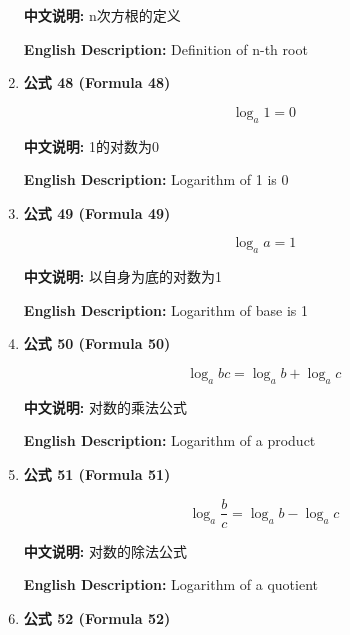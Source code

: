 \documentclass[12pt,a4paper]{article}
\begin{document}
\begin{enumerate}[leftmargin=*]
\textbf{中文说明:} n次方根的定义

\textbf{English Description:} Definition of n-th root

\vspace{0.5cm}

\item \textbf{公式 48 (Formula 48)}

\begin{equation}
\log_a{1} = 0
\end{equation}

\textbf{中文说明:} 1的对数为0

\textbf{English Description:} Logarithm of 1 is 0

\vspace{0.5cm}

\item \textbf{公式 49 (Formula 49)}

\begin{equation}
\log_a{a} = 1
\end{equation}

\textbf{中文说明:} 以自身为底的对数为1

\textbf{English Description:} Logarithm of base is 1

\vspace{0.5cm}

\item \textbf{公式 50 (Formula 50)}

\begin{equation}
\log_a{bc} = \log_a{b} + \log_a{c}
\end{equation}

\textbf{中文说明:} 对数的乘法公式

\textbf{English Description:} Logarithm of a product

\vspace{0.5cm}

\item \textbf{公式 51 (Formula 51)}

\begin{equation}
\log_a{\frac{b}{c}} = \log_a{b} - \log_a{c}
\end{equation}

\textbf{中文说明:} 对数的除法公式

\textbf{English Description:} Logarithm of a quotient

\vspace{0.5cm}

\item \textbf{公式 52 (Formula 52)}


\end{enumerate}
\end{document}
